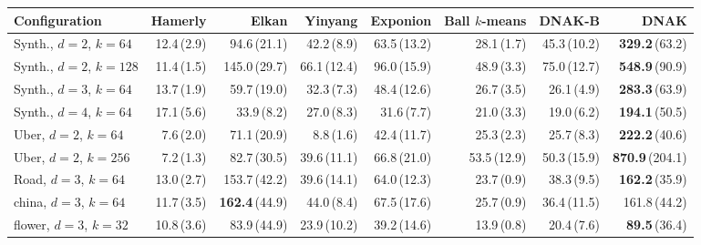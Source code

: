 \begin{tabular}{lrrrrrrr}
\toprule
Configuration & Hamerly & Elkan & Yinyang & Exponion & \shortstack[r]{Ball\\ $k$-means} & DNAK-B & DNAK \\
\midrule
Synth., $d{=}2$, $k{=}64$ & 12.4\,{\scriptsize(2.9)} & 94.6\,{\scriptsize(21.1)} & 42.2\,{\scriptsize(8.9)} & 63.5\,{\scriptsize(13.2)} & 28.1\,{\scriptsize(1.7)} & 45.3\,{\scriptsize(10.2)} & \textbf{329.2}\,{\scriptsize(63.2)} \\
Synth., $d{=}2$, $k{=}128$ & 11.4\,{\scriptsize(1.5)} & 145.0\,{\scriptsize(29.7)} & 66.1\,{\scriptsize(12.4)} & 96.0\,{\scriptsize(15.9)} & 48.9\,{\scriptsize(3.3)} & 75.0\,{\scriptsize(12.7)} & \textbf{548.9}\,{\scriptsize(90.9)} \\
Synth., $d{=}3$, $k{=}64$ & 13.7\,{\scriptsize(1.9)} & 59.7\,{\scriptsize(19.0)} & 32.3\,{\scriptsize(7.3)} & 48.4\,{\scriptsize(12.6)} & 26.7\,{\scriptsize(3.5)} & 26.1\,{\scriptsize(4.9)} & \textbf{283.3}\,{\scriptsize(63.9)} \\
Synth., $d{=}4$, $k{=}64$ & 17.1\,{\scriptsize(5.6)} & 33.9\,{\scriptsize(8.2)} & 27.0\,{\scriptsize(8.3)} & 31.6\,{\scriptsize(7.7)} & 21.0\,{\scriptsize(3.3)} & 19.0\,{\scriptsize(6.2)} & \textbf{194.1}\,{\scriptsize(50.5)} \\
Uber, $d{=}2$, $k{=}64$ & 7.6\,{\scriptsize(2.0)} & 71.1\,{\scriptsize(20.9)} & 8.8\,{\scriptsize(1.6)} & 42.4\,{\scriptsize(11.7)} & 25.3\,{\scriptsize(2.3)} & 25.7\,{\scriptsize(8.3)} & \textbf{222.2}\,{\scriptsize(40.6)} \\
Uber, $d{=}2$, $k{=}256$ & 7.2\,{\scriptsize(1.3)} & 82.7\,{\scriptsize(30.5)} & 39.6\,{\scriptsize(11.1)} & 66.8\,{\scriptsize(21.0)} & 53.5\,{\scriptsize(12.9)} & 50.3\,{\scriptsize(15.9)} & \textbf{870.9}\,{\scriptsize(204.1)} \\
Road, $d{=}3$, $k{=}64$ & 13.0\,{\scriptsize(2.7)} & 153.7\,{\scriptsize(42.2)} & 39.6\,{\scriptsize(14.1)} & 64.0\,{\scriptsize(12.3)} & 23.7\,{\scriptsize(0.9)} & 38.3\,{\scriptsize(9.5)} & \textbf{162.2}\,{\scriptsize(35.9)} \\
china, $d{=}3$, $k{=}64$ & 11.7\,{\scriptsize(3.5)} & \textbf{162.4}\,{\scriptsize(44.9)} & 44.0\,{\scriptsize(8.4)} & 67.5\,{\scriptsize(17.6)} & 25.7\,{\scriptsize(0.9)} & 36.4\,{\scriptsize(11.5)} & 161.8\,{\scriptsize(44.2)} \\
flower, $d{=}3$, $k{=}32$ & 10.8\,{\scriptsize(3.6)} & 83.9\,{\scriptsize(44.9)} & 23.9\,{\scriptsize(10.2)} & 39.2\,{\scriptsize(14.6)} & 13.9\,{\scriptsize(0.8)} & 20.4\,{\scriptsize(7.6)} & \textbf{89.5}\,{\scriptsize(36.4)} \\
\bottomrule
\end{tabular}
